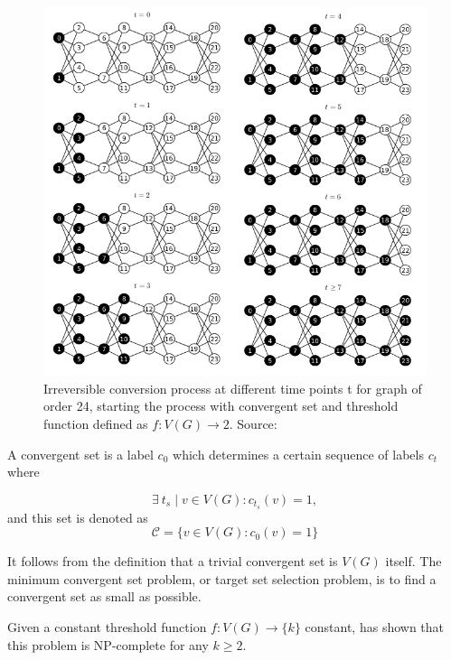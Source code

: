 \begin{figure}
  \includegraphics [width = \linewidth]{img/Figure3-1.png}
  \caption{Irreversible conversion process at different time points t for graph
of order 24, starting the process with convergent set and threshold function defined as $ f: V (G) \rightarrow {2}$. Source: \cite{amaral2015}}
  \label{fig: graph1}
\end{figure}

A convergent set is a label $ c_{0} $ which determines a certain sequence of labels $ c_ t$where

\begin{equation} 
\exists\ t_{s} \mid  v \in V(G) : c_{t_{s}}(v) = 1,
\end{equation}
and this set is denoted as
\begin{equation} 
\mathcal{C} = \{v \in V(G) : c_{0}(v) = 1\}
\end{equation}

  It follows from the definition that a trivial convergent set is $ V (G) $ itself. The minimum convergent set problem, or target set selection problem, is to find a convergent set as small as possible.

Given a constant threshold function $ f: V (G) \rightarrow \{k \}$ constant, \cite{centeno2011} has shown that this problem is NP-complete for any $ k \geq 2 $.

